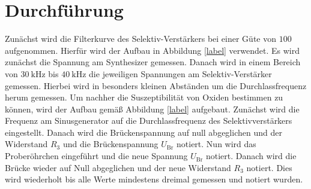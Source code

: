 
\section{Durchführung}
\label{sec:Durchführung}

Zunächst wird die Filterkurve des Selektiv-Verstärkers bei einer Güte von $100$ aufgenommen. Hierfür wird der Aufbau in Abbildung \ref{label} verwendet. Es wird zunächst die Spannung am Synthesizer gemessen. Danach wird in einem Bereich von $\SI{30}{\kilo\hertz}$ bis $\SI{40}{\kilo\hertz}$ die jeweiligen Spannungen am Selektiv-Verstärker gemessen. Hierbei wird in besonders kleinen Abständen um die Durchlassfrequenz herum gemessen. Um nachher die Suszeptibilität von Oxiden bestimmen zu können, wird der Aufbau gemäß Abbildung \ref{label} aufgebaut. Zunächst wird die Frequenz am Sinusgenerator auf die Durchlassfrequenz des Selektivverstärkers eingestellt. Danach wird die Brückenspannung auf null abgeglichen und der Widerstand $R_3$ und die Brückenspannung $U_\text{Br}$ notiert. Nun wird das Proberöhrchen eingeführt und die neue Spannung $U_\text{Br}$ notiert. Danach wird die Brücke wieder auf Null abgeglichen und der neue Widerstand $R_3$ notiert. Dies wird wiederholt bis alle Werte mindestens dreimal gemessen und notiert wurden. 